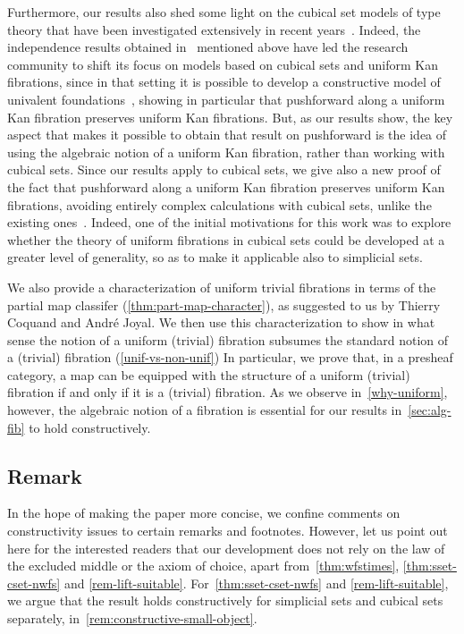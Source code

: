 \documentclass[reqno,10pt,a4paper,oneside,draft]{amsart}
\begin{document}
Furthermore, our results also shed some light on the cubical set models of type theory that have been
investigated extensively in recent years~\cite{awodey-cubical,coquand-cubical-sets,cohen-et-al:cubicaltt,pitts-cubical-nominal,swan-awfs}. Indeed, the independence results obtained in~\cite{coquand-non-constructivity-kan} mentioned above have led the research community to shift its focus on models based on cubical sets and uniform Kan fibrations, since in that setting it is possible to develop a constructive model of univalent foundations~\cite{cohen-et-al:cubicaltt}, showing in particular that pushforward along a uniform Kan fibration preserves uniform Kan fibrations. But, as our results show, the key aspect that makes it possible to obtain that result on pushforward is the idea of using the algebraic notion of a uniform Kan fibration, rather than working with cubical sets. Since our results apply to cubical sets, we give also a new proof of the fact that pushforward along a uniform Kan fibration preserves uniform Kan fibrations, avoiding entirely complex calculations with cubical sets, unlike the existing ones~\cite{cohen-et-al:cubicaltt,huber-thesis}.
Indeed, one of the initial motivations for this work was to explore whether the theory of uniform fibrations in cubical sets could be developed at a greater level of generality, so as to make it applicable also to simplicial sets.

We also provide a characterization of uniform trivial fibrations in terms of the partial map classifer (\cref{thm:part-map-character}), as suggested to us by Thierry Coquand and Andr\'e Joyal.
We then use this characterization to show in what sense the notion of a uniform (trivial) fibration subsumes the standard notion of a (trivial) fibration (\cref{unif-vs-non-unif}) In particular, we prove that, in a presheaf category, a map can be equipped with the structure of a uniform (trivial) fibration if and only if it is a (trivial) fibration.
As we observe in~\cref{why-uniform}, however, the algebraic notion of a fibration is essential for our results in~\cref{sec:alg-fib} to hold constructively.

\subsection*{Remark}
In the hope of making the paper more concise, we confine comments on constructivity issues to certain remarks and footnotes.
However, let us point out here for the interested readers that our development does not rely on the law of the excluded middle or the axiom of choice, apart from~\cref{thm:wfstimes}, \cref{thm:sset-cset-nwfs} and \cref{rem-lift-suitable}.
For~\cref{thm:sset-cset-nwfs} and \cref{rem-lift-suitable}, we argue that the result holds constructively for simplicial sets and cubical sets separately, in~\cref{rem:constructive-small-object}.%
\end{document}

